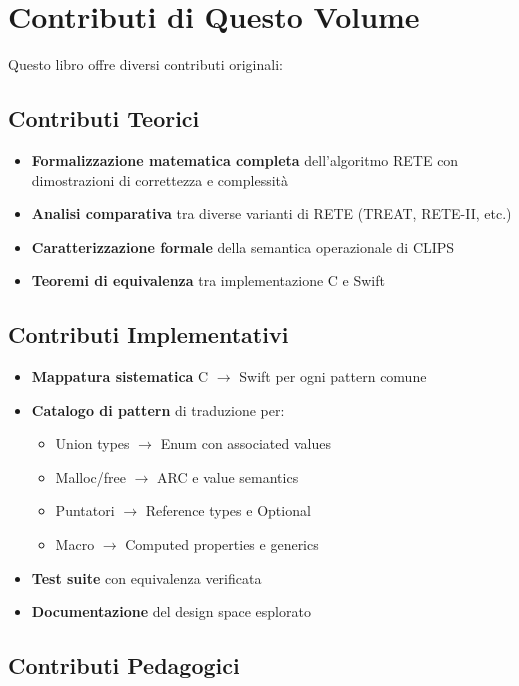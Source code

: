 \section{Contributi di Questo Volume}

Questo libro offre diversi contributi originali:

\subsection{Contributi Teorici}

\begin{itemize}
\item \textbf{Formalizzazione matematica completa} dell'algoritmo RETE con dimostrazioni di correttezza e complessità
\item \textbf{Analisi comparativa} tra diverse varianti di RETE (TREAT, RETE-II, etc.)
\item \textbf{Caratterizzazione formale} della semantica operazionale di CLIPS
\item \textbf{Teoremi di equivalenza} tra implementazione C e Swift
\end{itemize}

\subsection{Contributi Implementativi}

\begin{itemize}
\item \textbf{Mappatura sistematica} C $\to$ Swift per ogni pattern comune
\item \textbf{Catalogo di pattern} di traduzione per:
  \begin{itemize}
  \item Union types $\to$ Enum con associated values
  \item Malloc/free $\to$ ARC e value semantics
  \item Puntatori $\to$ Reference types e Optional
  \item Macro $\to$ Computed properties e generics
  \end{itemize}
\item \textbf{Test suite} con equivalenza verificata
\item \textbf{Documentazione} del design space esplorato
\end{itemize}

\subsection{Contributi Pedagogici}

